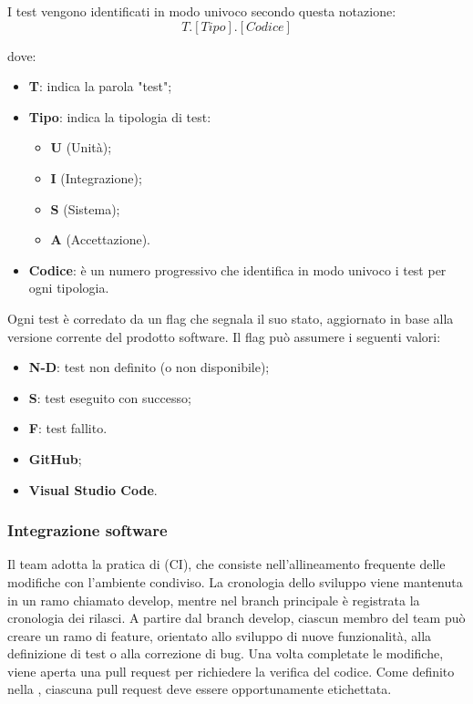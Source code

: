 \par I test vengono identificati in modo univoco secondo questa notazione:
\[T.[Tipo].[Codice]\]
\par dove:
\begin{itemize}
    \item \textbf{T}: indica la parola "test";
    \item \textbf{Tipo}: indica la tipologia di test:
        \begin{itemize}
            \item \textbf{U} (Unità);
            \item \textbf{I} (Integrazione);
            \item \textbf{S} (Sistema);
            \item \textbf{A} (Accettazione).
        \end{itemize}
    \item \textbf{Codice}: è un numero progressivo che identifica in modo univoco i test per ogni tipologia.
\end{itemize}

\par Ogni test è corredato da un flag che segnala il suo stato, aggiornato in base alla versione corrente del prodotto software. Il flag può assumere i seguenti valori:
\begin{itemize}
    \item \textbf{N-D}: test non definito (o non disponibile);
    \item \textbf{S}: test eseguito con successo;
    \item \textbf{F}: test fallito.
\end{itemize}

\begin{itemize}
  \item \textbf{GitHub};
  \item \textbf{Visual Studio Code}.
\end{itemize}

\subsubsection{Integrazione software}
\par Il team adotta la pratica di  (CI), che consiste nell’allineamento frequente delle modifiche con l’ambiente condiviso. La cronologia dello sviluppo viene mantenuta in un ramo chiamato develop, mentre nel branch principale è registrata la cronologia dei rilasci. A partire dal branch develop, ciascun membro del team può creare un ramo di feature, orientato allo sviluppo di nuove funzionalità, alla definizione di test o alla correzione di bug. Una volta completate le modifiche, viene aperta una pull request per richiedere la verifica del codice. Come definito nella , ciascuna pull request deve essere opportunamente etichettata.


